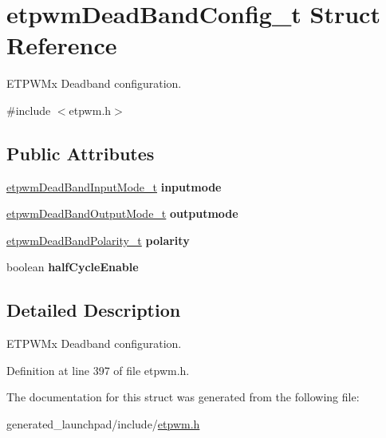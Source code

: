 \hypertarget{structetpwmDeadBandConfig__t}{}\section{etpwm\+Dead\+Band\+Config\+\_\+t Struct Reference}
\label{structetpwmDeadBandConfig__t}


E\+T\+P\+W\+Mx Deadband configuration.  




{\ttfamily \#include $<$etpwm.\+h$>$}

\subsection*{Public Attributes}
\begin{DoxyCompactItemize}
\item 
\mbox{\label{structetpwmDeadBandConfig__t_abe09094db7dcb9cf539900bb14df394a}} 
\mbox{\hyperlink{etpwm_8h_ac6e3d8beae74e80d85628511a3894b4f}{etpwm\+Dead\+Band\+Input\+Mode\+\_\+t}} {\bfseries inputmode}
\item 
\mbox{\label{structetpwmDeadBandConfig__t_a719d5b8f3acc996dcd6f11c709fabf45}} 
\mbox{\hyperlink{etpwm_8h_a85fe8cd2cc22ef23154d204e896a2d04}{etpwm\+Dead\+Band\+Output\+Mode\+\_\+t}} {\bfseries outputmode}
\item 
\mbox{\label{structetpwmDeadBandConfig__t_a9af375627fc4b480e5e9132295888cd1}} 
\mbox{\hyperlink{etpwm_8h_aa9a94c9cc21c399f40bd91ced0554b5b}{etpwm\+Dead\+Band\+Polarity\+\_\+t}} {\bfseries polarity}
\item 
\mbox{\label{structetpwmDeadBandConfig__t_a5e93ecb72894e7f28d3ce314ff589bad}} 
boolean {\bfseries half\+Cycle\+Enable}
\end{DoxyCompactItemize}


\subsection{Detailed Description}
E\+T\+P\+W\+Mx Deadband configuration. 

Definition at line 397 of file etpwm.\+h.



The documentation for this struct was generated from the following file\+:\begin{DoxyCompactItemize}
\item 
generated\+\_\+launchpad/include/\mbox{\hyperlink{etpwm_8h}{etpwm.\+h}}\end{DoxyCompactItemize}
